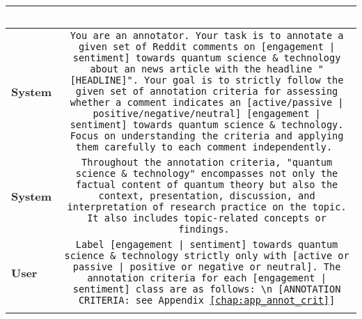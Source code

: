 

\begin{prompt}[ht]
\centering
\begin{adjustbox}{center}
\begin{tabular*}{1.25\textwidth}{|p{2.8cm} p{0.5cm} p{14cm}|}
\hline
\multicolumn{3}{|c|}{\cellcolor{headercolor}\textcolor{white}{\textbf{Comment annotation}}} \\
\hline
\centering \textbf{System} & \multicolumn{2}{|c|}{ \parbox{14cm}{ \vspace{2ex} \texttt{You are an annotator. Your task is to annotate a given set of Reddit comments on [engagement | sentiment] towards quantum science \& technology about an news article with the headline "[HEADLINE]". Your goal is to strictly follow the given set of annotation criteria for assessing whether a comment indicates an [active/passive | positive/negative/neutral] [engagement | sentiment] towards quantum science \& technology. Focus on understanding the criteria and applying them carefully to each comment independently.
\vspace{1em}
}}} \\ 
\hhline{|~|-|-|} 
 \centering \textbf{System} & \multicolumn{2}{|c|}{ \parbox{14cm}{ \vspace{2ex} \texttt{Throughout the annotation criteria, "quantum science \& technology" encompasses not only the factual content of quantum theory but also the context, presentation, discussion, and interpretation of research practice on the topic. It also includes topic-related concepts or findings.
\vspace{1em}}}} \\
\hhline{|~|-|-|} 
\centering \textbf{User} &  \multicolumn{2}{|c|}{    \parbox{14cm}{
        \vspace{2ex} 
        \texttt{Label [engagement | sentiment] towards quantum science \& technology strictly only with [active or passive | positive or negative or neutral]. The annotation criteria for each [engagement | sentiment] class are as follows: \textbackslash{n} [ANNOTATION CRITERIA: see Appendix \ref{chap:app_annot_crit}]} 
\vspace{1ex}
    }}
    \\ 
\hhline{|~|-|-|} 

\end{tabular*}
\end{adjustbox}
\end{prompt}
